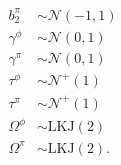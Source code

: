 \documentclass{beamer}
\begin{document}
\begin{frame}
\begin{footnotesize}
\begin{columns}
\begin{column}{0.5\textwidth}
\begin{align*}
          b^{\pi}_{2} &\sim \mathcal{N}(-1, 1) \\
          \gamma^{\phi} &\sim \mathcal{N}(0, 1) \\
          \gamma^{\pi} &\sim \mathcal{N}(0, 1) \\
          \tau^{\phi} &\sim \mathcal{N}^{+}(1) \\
          \tau^{\pi} &\sim \mathcal{N}^{+}(1) \\
          \Omega^{\phi} &\sim \text{LKJ}(2) \\
          \Omega^{\pi} &\sim \text{LKJ}(2). \\
        \end{align*}
      \end{column}
    \end{columns}
  \end{footnotesize} 
\end{frame}
\end{document}
